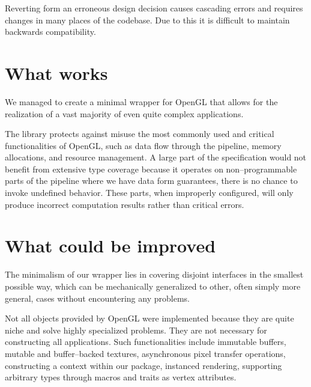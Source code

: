 Reverting form an erroneous design decision causes cascading errors and requires changes in many places of the codebase. Due to this it is difficult to maintain backwards compatibility.

\section{What works}

We managed to create a minimal wrapper for OpenGL that allows for the realization of a vast majority of even quite complex applications.

The library protects against misuse the most commonly used and critical functionalities of OpenGL, such as data flow through the pipeline, memory allocations, and resource management. A large part of the specification would not benefit from extensive type coverage because it operates on non--programmable parts of the pipeline where we have data form guarantees, there is no chance to invoke undefined behavior. These parts, when improperly configured, will only produce incorrect computation results rather than critical errors. 

\section{What could be improved}

The minimalism of our wrapper lies in covering disjoint interfaces in the smallest possible way, which can be mechanically generalized to other, often simply more general, cases without encountering any problems.

Not all objects provided by OpenGL were implemented because they are quite niche and solve highly specialized problems. 
They are not necessary for constructing all applications. 
Such functionalities include immutable buffers, mutable and buffer--backed textures, asynchronous pixel transfer operations, constructing a context within our package, instanced rendering, supporting arbitrary types through macros and traits as vertex attributes.
